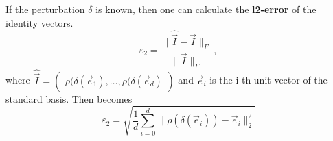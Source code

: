 If the perturbation $\delta$ is known, then one can calculate the \textbf{l2-error} of the identity vectors. 
\begin{equation}
\label{eqn:fro_error}
    \varepsilon_2 = \frac {\|\widehat {\vec I} - \vec I\|_F} {\|\vec I\|_F} \,,
\end{equation}
where $\widehat {\vec I} = \begin{pmatrix} \rho (\delta (\vec e_1), \dots, \rho (\delta (\vec e_d) \end{pmatrix}$ and $\vec e_i$ is the i-th unit vector of the standard basis.
%
Then  becomes
\begin{equation}
\label{eqn:l2_error}
    \varepsilon_2 = \sqrt{ \frac 1 d \sum_{i=0}^d \|\rho (\delta (\vec e_i)) 
        - \vec e_i  \|_2^2 }
\end{equation}


